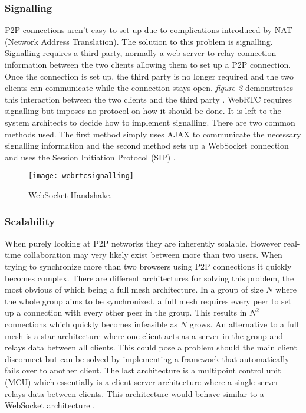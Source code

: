 \documentclass[prodmode,acmtecs]{acmsmall}
\begin{document}
\subsubsection{Signalling}
P2P connections aren't easy to set up due to complications introduced by NAT (Network Address Translation). The solution to this problem is signalling. Signalling requires a third party, normally a web server to relay connection information between the two clients allowing them to set up a P2P connection. Once the connection is set up, the third party is no longer required and the two clients can communicate while the connection stays open. \textit{figure 2} demonstrates this interaction between the two clients and the third party \cite{karadogan2014evaluating}. WebRTC requires signalling but imposes no protocol on how it should be done. It is left to the system architects to decide how to implement signalling. There are two common methods used. The first method simply uses AJAX to communicate the necessary signalling information and the second method sets up a WebSocket connection and uses the Session Initiation Protocol (SIP) \cite{adeyeye2013determining}.

\begin{figure}
\centerline{\texttt{[image: webrtcsignalling]}}
\caption{WebSocket Handshake.}
\label{figure:two}
\end{figure}

\subsubsection{Scalability}
When purely looking at P2P networks they are inherently scalable. However real-time collaboration may very likely exist between more than two users. When trying to synchronize more than two browsers using P2P connections it quickly becomes complex. There are different architectures for solving this problem, the most obvious of which being a full mesh architecture. In a group of size ${N}$ where the whole group aims to be synchronized, a full mesh requires every peer to set up a connection with every other peer in the group. This results in $N^2$ connections which quickly becomes infeasible as $N$ grows. An alternative to a full mesh is a star architecture where one client acts as a server in the group and relays data between all clients. This could pose a problem should the main client disconnect but can be solved by implementing a framework that automatically fails over to another client. The last architecture is a multipoint control unit (MCU) which essentially is a client-server architecture where a single server relays data between clients. This architecture would behave similar to a WebSocket architecture \cite{karadogan2014evaluating}.
\end{document}
